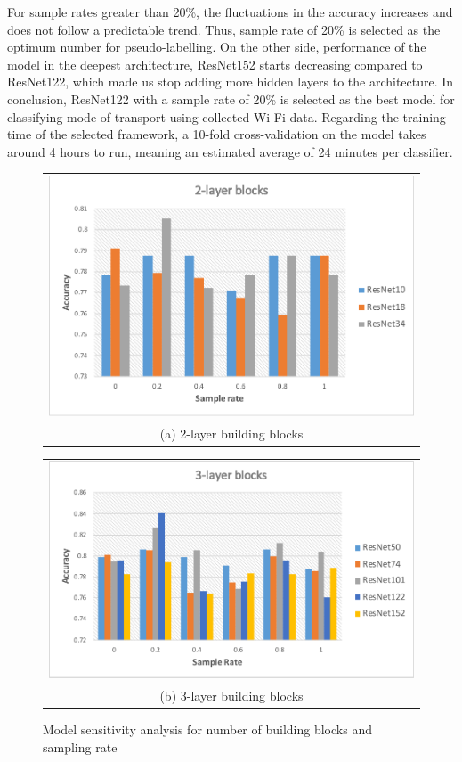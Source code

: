  For sample rates greater than 20\%, the fluctuations in the accuracy increases and does not follow a predictable trend. Thus, sample rate of 20\% is selected as the optimum number for pseudo-labelling. On the other side, performance of the model in the deepest architecture, ResNet152 starts decreasing compared to ResNet122, which made us stop adding more hidden layers to the architecture. In conclusion, ResNet122 with a sample rate of 20\% is selected as the best model for classifying mode of transport using collected Wi-Fi data. Regarding the training time of the selected framework, a 10-fold cross-validation on the model takes around 4 hours to run, meaning an estimated average of 24 minutes per classifier.
\begin{figure}[!ht]
  \centering
  \begin{tabular}{@{}c@{}}
    \includegraphics[width=0.8\linewidth]{chapter_2/figures/2layer.pdf} \\[\abovecaptionskip]
    \small (a) 2-layer building blocks
  \end{tabular}

  \vspace{\floatsep}

  \begin{tabular}{@{}c@{}}
    \includegraphics[width=0.8\linewidth]{chapter_2/figures/3layer.pdf} \\[\abovecaptionskip]
    \small (b) 3-layer building blocks
  \end{tabular}

  \caption{Model sensitivity analysis for number of building blocks and sampling rate}\label{fig:results2}
\end{figure}

